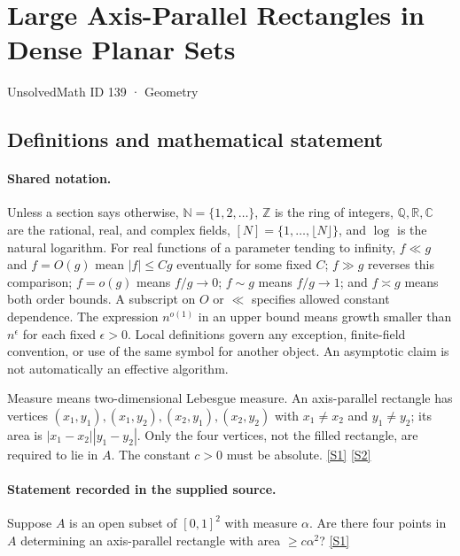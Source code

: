 \documentclass[11pt,a4paper]{article}
\newcommand{\N}{\mathbb{N}}
\newcommand{\Z}{\mathbb{Z}}
\newcommand{\Q}{\mathbb{Q}}
\newcommand{\R}{\mathbb{R}}
\newcommand{\C}{\mathbb{C}}
\newcommand{\sref}[2]{\hyperlink{source:#1:#2}{[S#2]}}
\begin{document}

\setcounter{section}{138}

\section{Large Axis-Parallel Rectangles in Dense Planar Sets}\label{139}

{\small\sffamily UnsolvedMath ID 139 · Geometry}

\subsection{Definitions and mathematical statement}

\paragraph{Shared notation.}Unless a section says otherwise, $\N=\{1,2,\ldots\}$,
$\Z$ is the ring of integers, $\Q,\R,\C$ are the rational, real, and complex
fields, $[N]=\{1,\ldots,\lfloor N\rfloor\}$, and $\log$ is the natural
logarithm. For real functions of a parameter tending to infinity,
$f\ll g$ and $f=O(g)$ mean $|f|\leq Cg$ eventually for some fixed $C$;
$f\gg g$ reverses this comparison; $f=o(g)$ means $f/g\to0$;
$f\sim g$ means $f/g\to1$; and $f\asymp g$ means both order bounds.
A subscript on $O$ or $\ll$ specifies allowed constant dependence.
The expression $n^{o(1)}$ in an upper bound means growth smaller than
$n^\epsilon$ for each fixed $\epsilon>0$. Local definitions govern any
exception, finite-field convention, or use of the same symbol for another
object. An asymptotic claim is not automatically an effective algorithm.



Measure means two-dimensional Lebesgue measure. An axis-parallel rectangle has vertices $(x_1,y_1),(x_1,y_2),(x_2,y_1),(x_2,y_2)$ with $x_1\ne x_2$ and $y_1\ne y_2$; its area is $|x_1-x_2||y_1-y_2|$. Only the four vertices, not the filled rectangle, are required to lie in $A$. The constant $c>0$ must be absolute. \sref{139}{1} \sref{139}{2}

\paragraph{Statement recorded in the supplied source.}
Suppose $A$ is an open subset of $[0, 1]^2$ with measure $\alpha$. Are there four points in $A$ determining an axis-parallel rectangle with area $\geq c\alpha^2$? \sref{139}{1}
\end{document}
